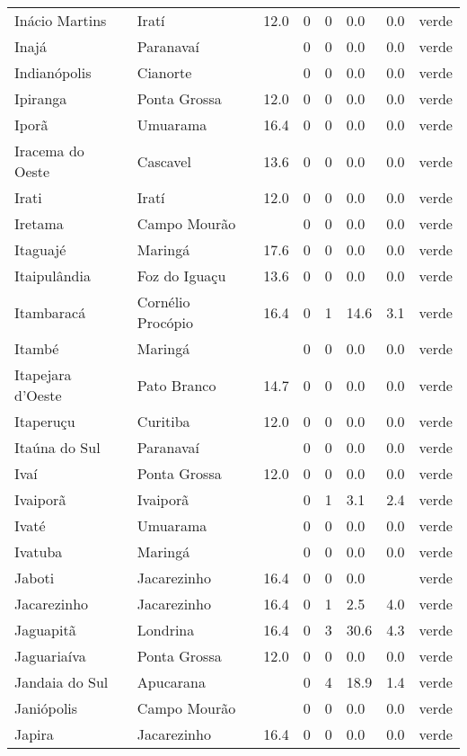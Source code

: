 \begin{longtable}{l|lllllll}
  Inácio Martins & Iratí & 12.0 & 0 & 0 & 0.0 & 0.0 & verde \\ 
  Inajá & Paranavaí &  & 0 & 0 & 0.0 & 0.0 & verde \\ 
  Indianópolis & Cianorte &  & 0 & 0 & 0.0 & 0.0 & verde \\ 
  Ipiranga & Ponta Grossa & 12.0 & 0 & 0 & 0.0 & 0.0 & verde \\ 
  Iporã & Umuarama & 16.4 & 0 & 0 & 0.0 & 0.0 & verde \\ 
  Iracema do Oeste & Cascavel & 13.6 & 0 & 0 & 0.0 & 0.0 & verde \\ 
  Irati & Iratí & 12.0 & 0 & 0 & 0.0 & 0.0 & verde \\ 
  Iretama & Campo Mourão &  & 0 & 0 & 0.0 & 0.0 & verde \\ 
  Itaguajé & Maringá & 17.6 & 0 & 0 & 0.0 & 0.0 & verde \\ 
  Itaipulândia & Foz do Iguaçu & 13.6 & 0 & 0 & 0.0 & 0.0 & verde \\ 
  Itambaracá & Cornélio Procópio & 16.4 & 0 & 1 & 14.6 & 3.1 & verde \\ 
  Itambé & Maringá &  & 0 & 0 & 0.0 & 0.0 & verde \\ 
  Itapejara d'Oeste & Pato Branco & 14.7 & 0 & 0 & 0.0 & 0.0 & verde \\ 
  Itaperuçu & Curitiba & 12.0 & 0 & 0 & 0.0 & 0.0 & verde \\ 
  Itaúna do Sul & Paranavaí &  & 0 & 0 & 0.0 & 0.0 & verde \\ 
  Ivaí & Ponta Grossa & 12.0 & 0 & 0 & 0.0 & 0.0 & verde \\ 
  Ivaiporã & Ivaiporã &  & 0 & 1 & 3.1 & 2.4 & verde \\ 
  Ivaté & Umuarama &  & 0 & 0 & 0.0 & 0.0 & verde \\ 
  Ivatuba & Maringá &  & 0 & 0 & 0.0 & 0.0 & verde \\ 
  Jaboti & Jacarezinho & 16.4 & 0 & 0 & 0.0 &  & verde \\ 
  Jacarezinho & Jacarezinho & 16.4 & 0 & 1 & 2.5 & 4.0 & verde \\ 
  Jaguapitã & Londrina & 16.4 & 0 & 3 & 30.6 & 4.3 & verde \\ 
  Jaguariaíva & Ponta Grossa & 12.0 & 0 & 0 & 0.0 & 0.0 & verde \\ 
  Jandaia do Sul & Apucarana &  & 0 & 4 & 18.9 & 1.4 & verde \\ 
  Janiópolis & Campo Mourão &  & 0 & 0 & 0.0 & 0.0 & verde \\ 
  Japira & Jacarezinho & 16.4 & 0 & 0 & 0.0 & 0.0 & verde \\ 

\end{longtable}
